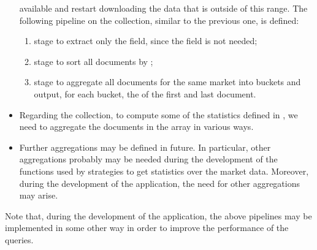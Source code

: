 \begin{itemize}
		available and restart downloading the data that is outside of
		this range. The following pipeline on the 
		collection, similar to the previous one, is defined:
		\begin{enumerate}
			\item {} stage to extract only the
				 field, since the  field
				is not needed;
			\item {} stage to sort all documents by
				;
			\item {} stage to aggregate all documents
				for the same market into buckets and output, for
				each bucket, the  of the first and
				last document.
		\end{enumerate}
	\item Regarding the  collection, to compute some of the
		statistics defined in , we need to aggregate the
		documents in the  array in various ways.
	\item Further aggregations may be defined in future. In particular,
		other aggregations probably may be needed during the development
		of the functions used by strategies to get statistics over the
		market data. Moreover, during the development of the
		application, the need for other aggregations may arise.
\end{itemize}

Note that, during the development of the application, the above pipelines may be
implemented in some other way 
in order to improve the performance of the queries.
